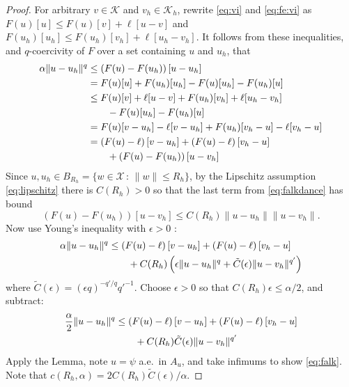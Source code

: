 \documentclass[]{interact}
\theoremstyle{plain}%
\theoremstyle{definition}
\theoremstyle{remark}
\newcommand{\eps}{\epsilon}
\newcommand{\cK}{\mathcal{K}}
\newcommand{\cX}{\mathcal{X}}
\begin{document}
\begin{proof}  For arbitrary $v\in\cK$ and $v_h\in\cK_h$, rewrite \eqref{eq:vi} and \eqref{eq:fe:vi} as $F(u)[u] \le F(u)[v] + \ell[u-v]$ and $F(u_h)[u_h] \le F(u_h)[v_h] + \ell[u_h-v_h]$.  It follows from these inequalities, and $q$-coercivity of $F$ over a set containing $u$ and $u_h$, that
\begin{align}
\alpha \|u-u_h\|^q &\le \left(F(u)-F(u_h)\right)[u-u_h] \label{eq:falkdance} \\
  &= F(u)[u] + F(u_h)[u_h] - F(u)[u_h] - F(u_h)[u] \notag \\
  &\le F(u)[v] + \ell[u-v] + F(u_h)[v_h] + \ell[u_h-v_h] \notag \\
  &\qquad - F(u)[u_h] - F(u_h)[u] \notag \\
  &= F(u)[v-u_h] - \ell[v-u_h] + F(u_h)[v_h-u] - \ell[v_h-u] \notag \\
  &= \left(F(u)-\ell\right)[v-u_h] + \left(F(u)-\ell\right)[v_h-u] \notag \\
  &\qquad + \left(F(u)-F(u_h)\right)[u-v_h] \notag
\end{align}
Since $u,u_h\in B_{R_h} = \{w\in\cX\,:\,\|w\|\le R_h\}$, by the Lipschitz assumption \eqref{eq:lipschitz} there is $C(R_h)>0$ so that the last term from \eqref{eq:falkdance} has bound
\begin{equation}
\left(F(u)-F(u_h)\right)[u-v_h] \le C(R_h) \|u-u_h\|\|u-v_h\|. \label{eq:falklip}
\end{equation}
Now use Young's inequality with $\eps>0$ \cite[Appendix B.2]{Evans2010}:
\begin{align}
\alpha \|u-u_h\|^q &\le \left(F(u)-\ell\right)[v-u_h] + \left(F(u)-\ell\right)[v_h-u]  \label{eq:falkyoung} \\
  &\qquad + C(R_h) \left(\eps\|u-u_h\|^q + \tilde C(\eps) \|u-v_h\|^{q'}\right) \notag
\end{align}
where $\tilde C(\eps) = (\eps q)^{-q'/q} {q'}^{-1}$.  Choose $\eps>0$ so that $C(R_h) \eps \le \alpha/2$, and subtract:
\begin{align}
\frac{\alpha}{2} \|u-u_h\|^q &\le \left(F(u)-\ell\right)[v-u_h] + \left(F(u)-\ell\right)[v_h-u]  \label{eq:abstract:five} \\
  &\qquad + C(R_h) \tilde C(\eps) \|u-v_h\|^{q'} \notag
\end{align}
Apply the Lemma, note $u=\psi$ a.e.~in $A_u$, and take infimums to show \eqref{eq:falk}.  Note that $c(R_h,\alpha)=2 C(R_h) \tilde C(\eps)/\alpha$.
\end{proof}
\end{document}
